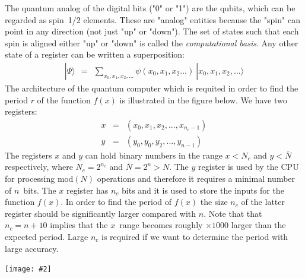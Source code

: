 \documentclass[onecolumn,fleqn]{revtex4}
\newcommand{\putgraph}[2][0.30\hsize]{\texttt{[image: \#2]}}
\newcommand{\beq}{\begin{eqnarray}}
\newcommand{\eeq}{\end{eqnarray}}
\begin{document}
The quantum analog of the digital bits ("0" or "1") 
are the qubits, which can be regarded as spin~1/2 elements.
These are "analog" entities because the "spin" can point 
in any direction (not just "up" or "down").   
The set of states such that each spin is aligned 
either "up" or "down" is called the \textit{computational basis}. 
Any other state of a register can be written a superposition: 
\beq
|\Psi \rangle \ \ = \ \ \sum_{x_0,x_1,x_2,...} \psi(x_0,x_1,x_2...) \ |x_0,x_1,x_2,...\rangle
\eeq
The architecture of the quantum computer which is 
requited in order to find the period $r$ of the function $f(x)$ 
is illustrated in the figure below. We have two registers:
\beq
x &=& (x_0,x_1,x_2,...,x_{n_c-1}) \\
y &=& (y_0,y_0,y_2,...,y_{n-1})
\eeq
The registers $x$ and $y$ can hold binary numbers 
in the range ${x<N_c}$ and ${y<\bar{N}}$ respectively, 
where ${N_c=2^{n_c}}$ and ${\bar{N}=2^{n} > N}$.
The $y$ register is used by the CPU for processing $\mbox{mod}(N)$ 
operations and therefore it requires a minimal number of $n$~bits. 
The $x$ register has $n_c$ bits and it is used to store 
the inputs for the function $f(x)$.
In order to find the period of $f(x)$ the 
size $n_c$ of the latter register should be 
significantly larger compared with $n$.
Note that that ${n_c=n+10}$ implies that 
the $x$~range becomes roughly ${\times 1000}$ larger 
than the expected period. 
Large $n_c$ is required if we want 
to determine the period with large accuracy. 



\begin{center}
\putgraph[0.6\hsize]{QCScheme1}
\end{center}
\end{document}

